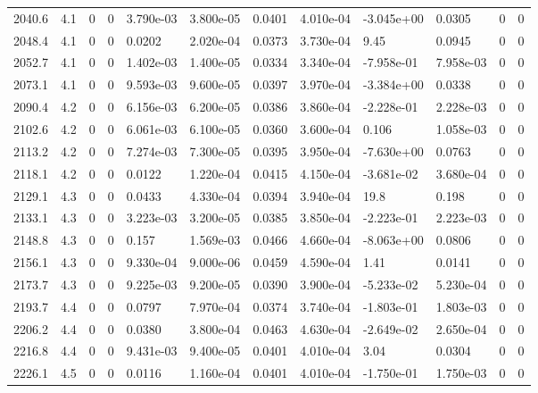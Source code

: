 \documentclass[preview]{standalone}
\begin{document}
{{{{{{\begin{tabular}{L{1.2cm}C{1.2cm} C{0.3cm}C{0.5cm} C{1.4cm}C{1.4cm} C{1.4cm}C{1.4cm} C{1.6cm}C{1.6cm} C{1.6cm}C{1.6cm}}
  2040.6  &   4.1  & 0     &  0 &  3.790e-03  & 3.800e-05  &  0.0401&   4.010e-04& -3.045e+00 & 0.0305   &  0 & 0  \\ 
  2048.4  &   4.1  & 0     &  0 &  0.0202  & 2.020e-04  &  0.0373&   3.730e-04& 9.45 & 0.0945   &  0 & 0  \\ 
  2052.7  &   4.1  & 0     &  0 &  1.402e-03  & 1.400e-05  &  0.0334&   3.340e-04& -7.958e-01 & 7.958e-03   &  0 & 0  \\ 
  2073.1  &   4.1  & 0     &  0 &  9.593e-03  & 9.600e-05  &  0.0397&   3.970e-04& -3.384e+00 & 0.0338   &  0 & 0  \\ 
  2090.4  &   4.2  & 0     &  0 &  6.156e-03  & 6.200e-05  &  0.0386&   3.860e-04& -2.228e-01 & 2.228e-03   &  0 & 0  \\ 
  2102.6  &   4.2  & 0     &  0 &  6.061e-03  & 6.100e-05  &  0.0360&   3.600e-04& 0.106 & 1.058e-03   &  0 & 0  \\ 
  2113.2  &   4.2  & 0     &  0 &  7.274e-03  & 7.300e-05  &  0.0395&   3.950e-04& -7.630e+00 & 0.0763   &  0 & 0  \\ 
  2118.1  &   4.2  & 0     &  0 &  0.0122  & 1.220e-04  &  0.0415&   4.150e-04& -3.681e-02 & 3.680e-04   &  0 & 0  \\ 
  2129.1  &   4.3  & 0     &  0 &  0.0433  & 4.330e-04  &  0.0394&   3.940e-04& 19.8 & 0.198   &  0 & 0  \\ 
  2133.1  &   4.3  & 0     &  0 &  3.223e-03  & 3.200e-05  &  0.0385&   3.850e-04& -2.223e-01 & 2.223e-03   &  0 & 0  \\ 
  2148.8  &   4.3  & 0     &  0 &  0.157  & 1.569e-03  &  0.0466&   4.660e-04& -8.063e+00 & 0.0806   &  0 & 0  \\ 
  2156.1  &   4.3  & 0     &  0 &  9.330e-04  & 9.000e-06  &  0.0459&   4.590e-04& 1.41 & 0.0141   &  0 & 0  \\ 
  2173.7  &   4.3  & 0     &  0 &  9.225e-03  & 9.200e-05  &  0.0390&   3.900e-04& -5.233e-02 & 5.230e-04   &  0 & 0  \\ 
  2193.7  &   4.4  & 0     &  0 &  0.0797  & 7.970e-04  &  0.0374&   3.740e-04& -1.803e-01 & 1.803e-03   &  0 & 0  \\ 
  2206.2  &   4.4  & 0     &  0 &  0.0380  & 3.800e-04  &  0.0463&   4.630e-04& -2.649e-02 & 2.650e-04   &  0 & 0  \\ 
  2216.8  &   4.4  & 0     &  0 &  9.431e-03  & 9.400e-05  &  0.0401&   4.010e-04& 3.04 & 0.0304   &  0 & 0  \\ 
  2226.1  &   4.5  & 0     &  0 &  0.0116  & 1.160e-04  &  0.0401&   4.010e-04& -1.750e-01 & 1.750e-03   &  0 & 0  \\ 

\end{tabular}}}}}}}
\end{document}
